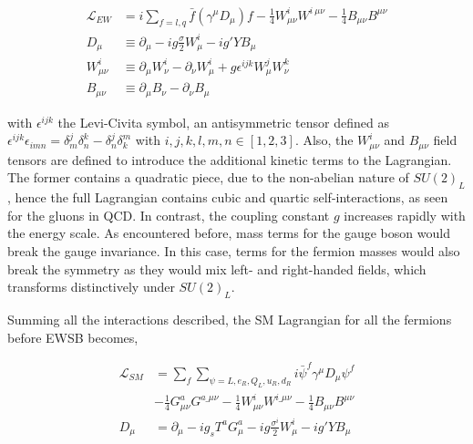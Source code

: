 \begin{equation}
\label{Theory_eq:EWlagrangian}
\begin{split}
    \mathcal{L}_{EW}&=i\sum_{f=l,q}\bar{f}(\gamma^\mu D_\mu)f - \frac{1}{4}W_{\mu\nu}^iW^{i\ \mu\nu} - \frac{1}{4}B_{\mu\nu}B^{\mu\nu}\\
    D_{\mu \ } &\equiv \partial_\mu - ig\frac{\sigma}{2}W_\mu^i-ig'YB_\mu \\
    W_{\mu\nu}^i &\equiv \partial_\mu W_\nu^i - \partial_\nu W_\mu^i +g\epsilon^{ijk}W_\mu^j W_\nu^k\\
    B_{\mu\nu}&\equiv\partial_\mu B_\nu - \partial_\nu B_\mu
    \end{split}
\end{equation}

with $\epsilon^{ijk}$ the Levi-Civita symbol, an antisymmetric tensor defined as $\epsilon^{ijk}\epsilon_{imn}=\delta^j_m\delta^k_n-\delta^j_n\delta^m_k$ with $i,j,k,l,m,n\in[1,2,3]$. Also, the $W_{\mu\nu}^i$ and $B_{\mu\nu}$ field tensors are defined to introduce the additional kinetic terms to the Lagrangian. The former contains a quadratic piece, due to the non-abelian nature of $SU(2)_L$, hence the full Lagrangian contains cubic and quartic self-interactions, as seen for the gluons in QCD. In contrast, the coupling constant $g$ increases rapidly with the energy scale. As encountered before, mass terms for the gauge boson would break the gauge invariance. In this case, terms for the fermion masses would also break the symmetry as they would mix left- and right-handed fields, which transforms distinctively under $SU(2)_L$.

Summing all the interactions described, the SM Lagrangian for all the fermions before \acrshort{EWSB} becomes,

\begin{equation}
    \label{Theory_eq:SMbeforeEWSB}
    \begin{split}
    \mathcal{L}_{SM} &= \sum_f\sum_{\psi=L,e_R,Q_L,u_R,d_R} i\bar{\psi}^f\gamma^\mu D_\mu \psi^f\\
    &- \frac{1}{4}G^a_{\mu\nu}G^{a\_\mu\nu} - \frac{1}{4}W^i_{\mu\nu}W^{i\_\mu\nu} - \frac{1}{4}B_{\mu\nu}B^{\mu\nu}\\
    D_\mu &= \partial_\mu - i g_s T^a G^a_\mu - i g \frac{\sigma^i}{2}W_\mu^i - ig'YB_\mu 
    \end{split}
\end{equation}

